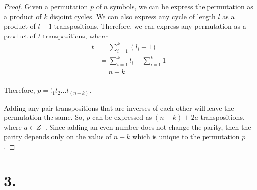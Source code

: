 \documentclass{article}
\begin{document}
\begin{proof}
  Given a permutation $p$ of $n$ symbols, we can be express the permutation as a product of $k$ disjoint cycles. We can also express any cycle of length $l$ as a product of $l-1$ transpositions. Therefore, we can express any permutation as a product of $t$ transpositions, where:
  \begin{align*}
    t &= \sum_{i=1}^{k} (l_i - 1) \\
      &= \sum_{i=1}^{k} l_i - \sum_{i=1}^{k} 1 \\
      &= n - k \\
  \end{align*}

  \noindent
  Therefore, $p = t_1t_2...t_(n-k)$.
  
  \noindent
  Adding any pair transpositions that are inverses of each other will leave the permutation the same.
  So, $p$ can be expressed as $(n-k) + 2a$ transpositions, where $a \in Z^+$. Since adding an even number does not change the parity, then the parity depends only on the value of $n-k$ which is unique to the permutation $p$.

\end{proof}

\section*{3.}
\end{document}
